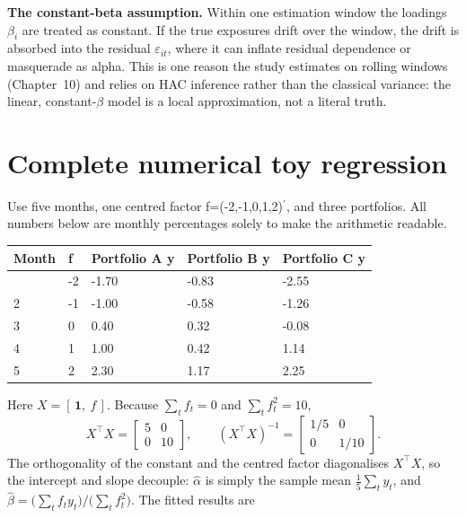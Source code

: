 \textbf{The constant-beta assumption.} Within one estimation window the
loadings $\beta_i$ are treated as constant. If the true exposures drift
over the window, the drift is absorbed into the residual $\varepsilon_{it}$,
where it can inflate residual dependence or masquerade as alpha. This is
one reason the study estimates on rolling windows (Chapter~10) and relies
on HAC inference rather than the classical variance: the linear,
constant-$\beta$ model is a local approximation, not a literal truth.

\hypertarget{complete-numerical-toy-regression}{%
\section{Complete numerical toy
regression}\label{complete-numerical-toy-regression}}

Use five months, one centred factor f=(-2,-1,0,1,2)\ensuremath{{}^{\prime}}, and three
portfolios. All numbers below are monthly percentages solely to make the
arithmetic readable.

\begin{longtable}[]{@{}p{}p{}p{}p{}p{}@{}}
\toprule\noalign{}
Month & f & Portfolio A y & Portfolio B y & Portfolio C y \\
\midrule\noalign{}
\endhead
\bottomrule\noalign{}
\endlastfoot
1 & -2 & -1.70 & -0.83 & -2.55 \\
2 & -1 & -1.00 & -0.58 & -1.26 \\
3 & 0 & 0.40 & 0.32 & -0.08 \\
4 & 1 & 1.00 & 0.42 & 1.14 \\
5 & 2 & 2.30 & 1.17 & 2.25 \\
\end{longtable}

Here $X=[\,\mathbf 1,\ f\,]$. Because $\sum_t f_t=0$ and $\sum_t f_t^2=10$,
\begin{equation}\label{eq:toy-xtx}
X^{\top}X = \begin{bmatrix}5 & 0\\ 0 & 10\end{bmatrix},
\qquad
(X^{\top}X)^{-1} = \begin{bmatrix}1/5 & 0\\ 0 & 1/10\end{bmatrix}.
\end{equation}
The orthogonality of the constant and the centred factor diagonalises
$X^{\top}X$, so the intercept and slope decouple: $\hat\alpha$ is simply
the sample mean $\tfrac15\sum_t y_t$, and
$\hat\beta = \bigl(\sum_t f_t y_t\bigr)/\bigl(\sum_t f_t^2\bigr)$. The
fitted results are

